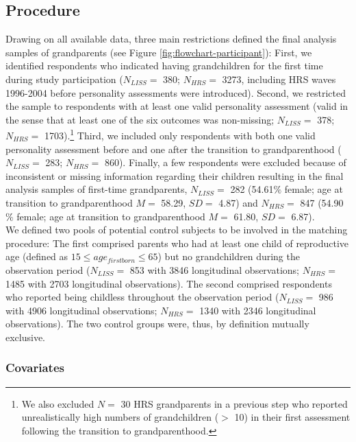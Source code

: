 \documentclass[
  english,
  man, noextraspace,floatsintext]{apa7}
\begin{document}
\hypertarget{procedure}{%
\subsection{Procedure}\label{procedure}}

Drawing on all available data, three main restrictions defined the final analysis samples of grandparents (see Figure \ref{fig:flowchart-participant}): First, we identified respondents who indicated having grandchildren for the first time during study participation (\(N_{LISS} =\) 380; \(N_{HRS} =\) 3273, including HRS waves 1996-2004 before personality assessments were introduced). Second, we restricted the sample to respondents with at least one valid personality assessment (valid in the sense that at least one of the six outcomes was non-missing; \(N_{LISS} =\) 378; \(N_{HRS} =\) 1703).\footnote{We also excluded \(N =\) 30 HRS grandparents in a previous step who reported unrealistically high numbers of grandchildren (\(>\) 10) in their first assessment following the transition to grandparenthood.} Third, we included only respondents with both one valid personality assessment before and one after the transition to grandparenthood (\(N_{LISS} =\) 283; \(N_{HRS} =\) 860). Finally, a few respondents were excluded because of inconsistent or missing information regarding their children resulting in the final analysis samples of first-time grandparents, \(N_{LISS} =\) 282 (54.61\(\%\) female; age at transition to grandparenthood \(M =\) 58.29, \(SD =\) 4.87) and \(N_{HRS} =\) 847 (54.90\(\%\) female; age at transition to grandparenthood \(M =\) 61.80, \(SD =\) 6.87).\\
We defined two pools of potential control subjects to be involved in the matching procedure: The first comprised parents who had at least one child of reproductive age (defined as \(15 \leq age_{firstborn}\leq65\)) but no grandchildren during the observation period (\(N_{LISS} =\) 853 with 3846 longitudinal observations; \(N_{HRS} =\) 1485 with 2703 longitudinal observations). The second comprised respondents who reported being childless throughout the observation period (\(N_{LISS} =\) 986 with 4906 longitudinal observations; \(N_{HRS} =\) 1340 with 2346 longitudinal observations). The two control groups were, thus, by definition mutually exclusive.

\hypertarget{covariates}{%
\subsubsection{Covariates}\label{covariates}}
\end{document}

